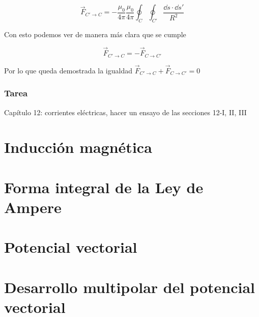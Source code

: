 \documentclass[11pt]{report}
\theoremstyle{plain}
\theoremstyle{definition}
\begin{document}
\begin{equation} %
	\vec{F}_{C' \rightarrow C} = - \frac{\mu_0}{4\pi} \frac{\mu_0}{4\pi}\oint_C \oint_{C'} \frac{\dd{s} \cdot \dd{s'}}{R^2}
	\label{eq:ley_ampere_no_cruz}
\end{equation}


Con esto podemos ver de manera más clara que se cumple

\begin{equation*} %
	\vec{F}_{C' \rightarrow C} = - \vec{F}_{C \rightarrow C'} 
\end{equation*}

Por lo que queda demostrada la igualdad $\vec{F}_{C' \rightarrow C} + \vec{F}_{C \rightarrow C'} = 0$

\subsection{Tarea}
Capítulo 12: corrientes eléctricas, hacer un ensayo de las secciones 12-I, II, III




\chapter{Inducción magnética}


\chapter{Forma integral de la Ley de Ampere}


\chapter{Potencial vectorial}


\chapter{Desarrollo multipolar del potencial vectorial}
\end{document}
